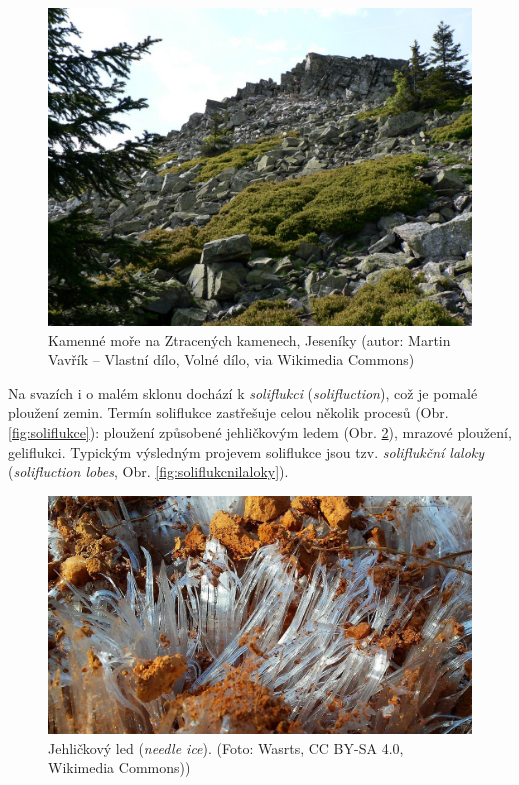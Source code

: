 \begin{figure}[h]
	\centering
	\includegraphics[width=1\linewidth]{obrazky/periglac/kamenne_more}
	\caption{Kamenné moře na Ztracených kamenech, Jeseníky (autor: Martin Vavřík – Vlastní dílo, Volné dílo, via Wikimedia Commons)}
	\label{fig:kamennemore}
\end{figure}

Na svazích i o malém sklonu dochází k \emph{soliflukci} (\textit{solifluction}), což je pomalé ploužení zemin. Termín soliflukce zastřešuje celou několik procesů (Obr. \ref{fig:soliflukce}): ploužení způsobené jehličkovým ledem (Obr. \ref{fig:jehlickovyled}), mrazové ploužení, geliflukci. Typickým výsledným projevem soliflukce jsou tzv. \emph{soliflukční laloky} (\textit{solifluction lobes}, Obr. \ref{fig:soliflukcnilaloky}).

\begin{figure}[h]
	\centering
	\includegraphics[width=1\linewidth]{obrazky/periglac/jehlickovy_led}
	\caption{Jehličkový led (\textit{needle ice}). (Foto: Wasrts, CC BY-SA 4.0, Wikimedia Commons))}
	\label{fig:jehlickovyled}
\end{figure}

